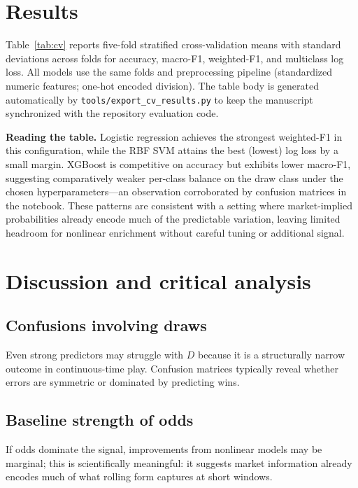 \documentclass[11pt,a4paper]{article}
\begin{document}
\section{Results}
Table~\ref{tab:cv} reports five-fold stratified cross-validation means with standard deviations across folds for accuracy, macro-F1, weighted-F1, and multiclass log loss. All models use the same folds and preprocessing pipeline (standardized numeric features; one-hot encoded division). The table body is generated automatically by \texttt{tools/export\_cv\_results.py} to keep the manuscript synchronized with the repository evaluation code.

\begin{table}[t]
\centering
\caption{Five-fold stratified CV performance (mean \(\pm\) std). Log loss is the multiclass cross-entropy computed from predicted probabilities where available.}
\label{tab:cv}

\end{table}

\noindent\textbf{Reading the table.} Logistic regression achieves the strongest weighted-F1 in this configuration, while the RBF SVM attains the best (lowest) log loss by a small margin. XGBoost is competitive on accuracy but exhibits lower macro-F1, suggesting comparatively weaker per-class balance on the draw class under the chosen hyperparameters---an observation corroborated by confusion matrices in the notebook. These patterns are consistent with a setting where market-implied probabilities already encode much of the predictable variation, leaving limited headroom for nonlinear enrichment without careful tuning or additional signal.

\section{Discussion and critical analysis}
\subsection{Confusions involving draws}
Even strong predictors may struggle with \(D\) because it is a structurally narrow outcome in continuous-time play. Confusion matrices typically reveal whether errors are symmetric or dominated by predicting wins.

\subsection{Baseline strength of odds}
If odds dominate the signal, improvements from nonlinear models may be marginal; this is scientifically meaningful: it suggests market information already encodes much of what rolling form captures at short windows.
\end{document}

